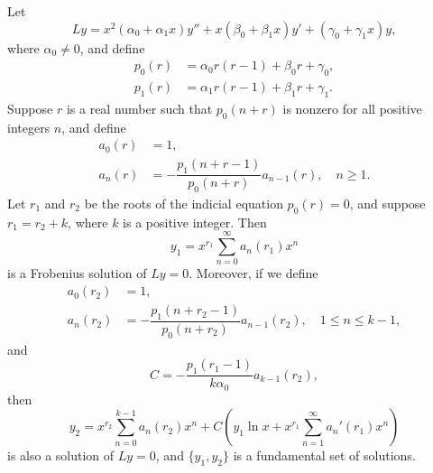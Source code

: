 \begin{theorem}\label{thmtype:7.7.1}
Let
\[
Ly=
x^2(\alpha_0+\alpha_1x)y''+x(\beta_0+\beta_1x)y'
+(\gamma_0+\gamma_1x)y,
\]
where $\alpha_0\ne0$, and  define
\begin{align*}
p_0(r)&=\alpha_0r(r-1)+\beta_0r+\gamma_0,\\[5pt]
p_1(r)&=\alpha_1r(r-1)+\beta_1r+\gamma_1.
\end{align*}
Suppose   $r$ is a real number such that $p_0(n+r)$ is nonzero
for all positive integers $n$, and  define
\begin{equation} \label{eq:7.7.2}
\begin{aligned}
a_0(r)&=1,\\
a_n(r)&=-\dfrac{p_1(n+r-1)}{p_0(n+r)}a_{n-1}(r),\quad n\ge1.
\end{aligned}
\end{equation}
Let $r_1$ and $r_2$ be the roots of the indicial equation
$p_0(r)=0$, and suppose $r_1=r_2+k$, where $k$ is a positive
integer. Then
\[
y_1=x^{r_1}\sum_{n=0}^\infty  a_n(r_1)x^n
\]
is a Frobenius solution of $Ly=0$.
Moreover, if we define
\begin{equation} \label{eq:7.7.3}
\begin{aligned}
a_0(r_2)&=1,\\
a_n(r_2)&=-\dfrac{p_1(n+r_2-1)}{p_0(n+r_2)}a_{n-1}(r_2),\quad
1\le n\le k-1,
\end{aligned}
\end{equation}
and
\begin{equation} \label{eq:7.7.4}
C=-\frac{p_1(r_1-1)}{k\alpha_0}a_{k-1}(r_2),
\end{equation}
then
\begin{equation} \label{eq:7.7.5}
y_2=x^{r_2}\sum_{n=0}^{k-1}a_n(r_2)x^n+C\left(y_1\ln
x+x^{r_1}\sum_{n=1}^\infty a_n'(r_1)x^n\right)
\end{equation}
is also a   solution of $Ly=0$, and $\{y_1,y_2\}$
is a fundamental set of  solutions.
\end{theorem}

